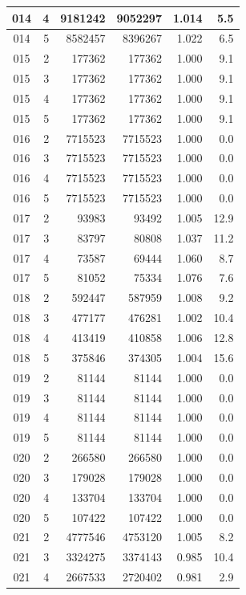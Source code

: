\begin{longtable}{|c|r|r|r|r|r|}
\hline
014 & 4 & 9181242 & 9052297 & 1.014 & 5.5 \\
\hline
014 & 5 & 8582457 & 8396267 & 1.022 & 6.5 \\
\hline
015 & 2 & 177362 & 177362 & 1.000 & 9.1 \\
\hline
015 & 3 & 177362 & 177362 & 1.000 & 9.1 \\
\hline
015 & 4 & 177362 & 177362 & 1.000 & 9.1 \\
\hline
015 & 5 & 177362 & 177362 & 1.000 & 9.1 \\
\hline
016 & 2 & 7715523 & 7715523 & 1.000 & 0.0 \\
\hline
016 & 3 & 7715523 & 7715523 & 1.000 & 0.0 \\
\hline
016 & 4 & 7715523 & 7715523 & 1.000 & 0.0 \\
\hline
016 & 5 & 7715523 & 7715523 & 1.000 & 0.0 \\
\hline
017 & 2 & 93983 & 93492 & 1.005 & 12.9 \\
\hline
017 & 3 & 83797 & 80808 & 1.037 & 11.2 \\
\hline
017 & 4 & 73587 & 69444 & 1.060 & 8.7 \\
\hline
017 & 5 & 81052 & 75334 & 1.076 & 7.6 \\
\hline
018 & 2 & 592447 & 587959 & 1.008 & 9.2 \\
\hline
018 & 3 & 477177 & 476281 & 1.002 & 10.4 \\
\hline
018 & 4 & 413419 & 410858 & 1.006 & 12.8 \\
\hline
018 & 5 & 375846 & 374305 & 1.004 & 15.6 \\
\hline
019 & 2 & 81144 & 81144 & 1.000 & 0.0 \\
\hline
019 & 3 & 81144 & 81144 & 1.000 & 0.0 \\
\hline
019 & 4 & 81144 & 81144 & 1.000 & 0.0 \\
\hline
019 & 5 & 81144 & 81144 & 1.000 & 0.0 \\
\hline
020 & 2 & 266580 & 266580 & 1.000 & 0.0 \\
\hline
020 & 3 & 179028 & 179028 & 1.000 & 0.0 \\
\hline
020 & 4 & 133704 & 133704 & 1.000 & 0.0 \\
\hline
020 & 5 & 107422 & 107422 & 1.000 & 0.0 \\
\hline
021 & 2 & 4777546 & 4753120 & 1.005 & 8.2 \\
\hline
021 & 3 & 3324275 & 3374143 & 0.985 & 10.4 \\
\hline
021 & 4 & 2667533 & 2720402 & 0.981 & 2.9 \\

\end{longtable}
